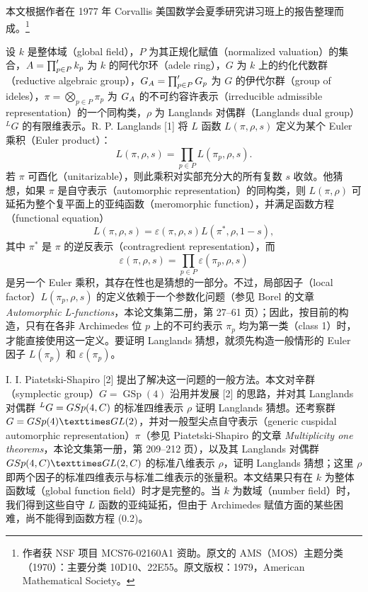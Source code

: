 
本文根据作者在 1977 年 Corvallis 美国数学会夏季研究讲习班上的报告整理而成。\footnote{作者获 NSF 项目 MCS76-02160A1 资助。原文的 AMS（MOS）主题分类（1970）：主要分类 10D10、22E55。原文版权：1979，American Mathematical Society。}

设 $k$ 是整体域（global field），$P$ 为其正规化赋值（normalized valuation）的集合，$A=\prod_{p\in P}'k_p$ 为 $k$ 的阿代尔环（adele ring），$G$ 为 $k$ 上的约化代数群（reductive algebraic group），$G_A=\prod_{p\in P}'G_p$ 为 $G$ 的伊代尔群（group of ideles），$\pi=\bigotimes_{p\in P}\pi_p$ 为 $G_A$ 的不可约容许表示（irreducible admissible representation）的一个同构类，$\rho$ 为 Langlands 对偶群（Langlands dual group）${}^LG$ 的有限维表示。R. P. Langlands [1] 将 $L$ 函数 $L(\pi,\rho,s)$ 定义为某个 Euler 乘积（Euler product）：
\begin{equation}
 L(\pi,\rho,s)=\prod_{p\in P}L(\pi_p,\rho,s).
 \tag{0.1}
\end{equation}
若 $\pi$ 可酉化（unitarizable），则此乘积对实部充分大的所有复数 $s$ 收敛。他猜想，如果 $\pi$ 是自守表示（automorphic representation）的同构类，则 $L(\pi,\rho)$ 可延拓为整个复平面上的亚纯函数（meromorphic function），并满足函数方程（functional equation）
\begin{equation}
 L(\pi,\rho,s)=\varepsilon(\pi,\rho,s)L(\pi^*,\rho,1-s),
 \tag{0.2}
\end{equation}
其中 $\pi^*$ 是 $\pi$ 的逆反表示（contragredient representation），而
\[
 \varepsilon(\pi,\rho,s)=\prod_{p\in P}\varepsilon(\pi_p,\rho,s)
\]
是另一个 Euler 乘积，其存在性也是猜想的一部分。不过，局部因子（local factor）$L(\pi_p,\rho,s)$ 的定义依赖于一个参数化问题（参见 Borel 的文章 \emph{Automorphic L-functions}，本论文集第二册，第 27--61 页）；因此，按目前的构造，只有在各非 Archimedes 位 $p$ 上的不可约表示 $\pi_p$ 均为第一类（class 1）时，才能直接使用这一定义。要证明 Langlands 猜想，就须先构造一般情形的 Euler 因子 $L(\pi_p)$ 和 $\varepsilon(\pi_p)$。

I. I. Piatetski-Shapiro [2] 提出了解决这一问题的一般方法。本文对辛群（symplectic group）$G=\operatorname{GSp}(4)$ 沿用并发展 [2] 的思路，并对其 Langlands 对偶群 ${}^LG=GSp(4,C)$ 的标准四维表示 $\rho$ 证明 Langlands 猜想。还考察群 $G=\operatorname{GSp}(4)\times\GL(2)$，并对一般型尖点自守表示（generic cuspidal automorphic representation）$\pi$（参见 Piatetski-Shapiro 的文章 \emph{Multiplicity one theorems}，本论文集第一册，第 209--212 页），以及其 Langlands 对偶群 $\operatorname{GSp}(4,\C)\times\GL(2,\C)$ 的标准八维表示 $\rho$，证明 Langlands 猜想；这里 $\rho$ 即两个因子的标准四维表示与标准二维表示的张量积。本文结果只有在 $k$ 为整体函数域（global function field）时才是完整的。当 $k$ 为数域（number field）时，我们得到这些自守 $L$ 函数的亚纯延拓，但由于 Archimedes 赋值方面的某些困难，尚不能得到函数方程 (0.2)。

